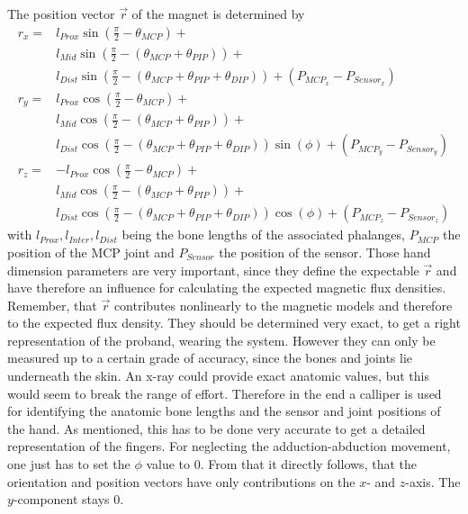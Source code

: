 The position vector $ \vec{r} $ of the magnet is determined by
\begin{equation}\label{eq:posX}
\begin{aligned}
r_{x} =& l_{Prox}\sin(\frac{\pi}{2}-\theta_{MCP}) +\\
& l_{Mid}\sin(\frac{\pi}{2}-(\theta_{MCP}+\theta_{PIP})) +\\
& l_{Dist}\sin(\frac{\pi}{2}-(\theta_{MCP}+\theta_{PIP}+\theta_{DIP})) + (P_{MCP_{x}} - P_{Sensor_{x}}) \\[4pt]
r_{y} =& l_{Prox}\cos(\frac{\pi}{2}-\theta_{MCP}) +\\
& l_{Mid}\cos(\frac{\pi}{2}-(\theta_{MCP}+\theta_{PIP})) +\\
& l_{Dist}\cos(\frac{\pi}{2}-(\theta_{MCP}+\theta_{PIP}+\theta_{DIP}))\sin(\phi) + (P_{MCP_{y}} - P_{Sensor_{y}}) \\[4pt]
r_{z} =& -l_{Prox}\cos(\frac{\pi}{2}-\theta_{MCP}) +\\
& l_{Mid}\cos(\frac{\pi}{2}-(\theta_{MCP}+\theta_{PIP})) +\\
& l_{Dist}\cos(\frac{\pi}{2}-(\theta_{MCP}+\theta_{PIP}+\theta_{DIP}))\cos(\phi) +(P_{MCP_{z}} - P_{Sensor_{z}})
\end{aligned}
\end{equation}
with $ l_{Prox}, l_{Inter}, l_{Dist} $ being the bone lengths of the associated phalanges, $ P_{MCP} $ the position of the \ac{MCP} joint and $ P_{Sensor} $ the position of the sensor. Those hand dimension parameters are very important, since they define the expectable $ \vec{r} $ and have therefore an influence for calculating the expected magnetic flux densities. Remember, that $ \vec{r} $ contributes nonlinearly to the magnetic models and therefore to the expected flux density. They should be determined very exact, to get a right representation of the proband, wearing the system. However they can only be measured up to a certain grade of accuracy, since the bones and joints lie underneath the skin. An x-ray could provide exact anatomic values, but this would seem to break the range of effort. Therefore in the end a calliper is used for identifying the anatomic bone lengths and the sensor and joint positions of the hand. As mentioned, this has to be done very accurate to get a detailed representation of the fingers. For neglecting the adduction-abduction movement, one just has to set the $ \phi $ value to 0. From that it directly follows, that the orientation and position vectors have only contributions on the $ x $- and $ z $-axis. The $ y $-component stays 0.\\
